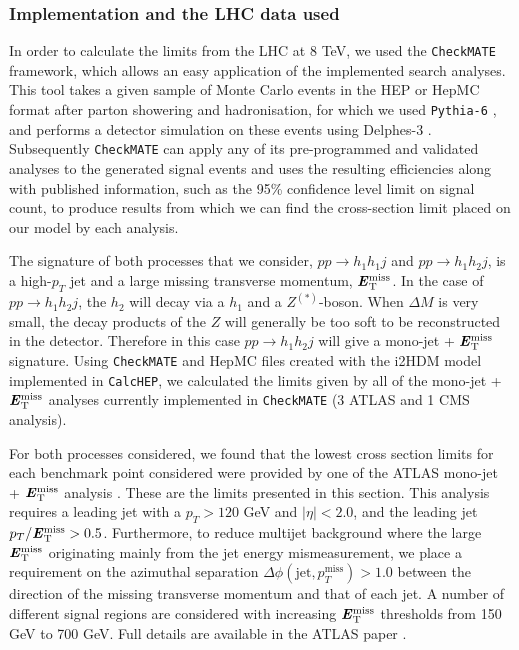 \documentclass[12pt,a4paper]{article}
\newcommand{\MET}{\textbf{\textit{E}$_{\rm T}^{\rm miss}$}}
\begin{document}
\subsubsection{Implementation and the LHC data used}

In order to calculate the limits from the LHC at 8 TeV, we used the {\tt CheckMATE}
\cite{Drees:2013wra,deFavereau:2013fsa,Cacciari:2011ma,Cacciari:2005hq,Cacciari:2008gp,Read:2002hq,Lester:1999tx,Barr:2003rg,Cheng:2008hk} framework, which allows an easy
application of the implemented search analyses. This tool takes a given sample of Monte Carlo events in the HEP or HepMC format after parton showering and hadronisation,
for which we used {\tt Pythia-6} \cite{Sjostrand:2006za}, and performs a detector simulation on these events using Delphes-3 \cite{deFavereau:2013fsa}. Subsequently {\tt CheckMATE} can
apply any of its pre-programmed and validated analyses to the generated signal events and uses the resulting efficiencies along with published information, such as the 95\%
confidence level limit on signal count, to produce results from which we can find the cross-section limit placed on our model by each analysis.

The signature of both processes that we consider, $pp\rightarrow h_1h_1j$  and $pp\rightarrow h_1h_2j$,
is a high-$p_T$ jet and a large missing transverse momentum, $\MET{}$. 
In the case of $pp\rightarrow h_1h_2j$, the $h_2$ will decay via a $h_1$ and a $Z^{(*)}$-boson. When $\Delta M$ is very small, the decay
products of the $Z$ will generally be too soft to be reconstructed in the detector. Therefore in this case $pp\rightarrow h_1h_2j$ will give a mono-jet + $\MET{}$
signature. Using {\tt CheckMATE} and HepMC files created with the i2HDM model implemented in {\tt CalcHEP}, we calculated the limits given by all of the mono-jet +
$\MET{}$ analyses currently implemented in {\tt CheckMATE} \cite{ATLAS:2012zim,Aad:2014nra,Aad:2015zva,Khachatryan:2014rra} (3 ATLAS and 1 CMS analysis).

For both processes considered, we found that the lowest cross section limits for each benchmark point considered were provided by one of the ATLAS mono-jet +
$\MET{}$ analysis \cite{Aad:2015zva}. These are the limits presented in this section. This analysis requires a leading jet with a $p_T > 120$ GeV and $|\eta|
<2.0$, and the leading jet $p_T/\MET > 0.5$. Furthermore, to reduce multijet background where the large $\MET{}$ originating mainly from the jet energy
mismeasurement, we place a requirement on the azimuthal separation $\Delta \phi (\text{jet},p_T^{\text{miss}}) > 1.0$ between the direction of the missing transverse momentum
and that of each jet. A number of different signal regions are considered with increasing $\MET{}$ thresholds from 150 GeV to 700 GeV. Full details are available in
the ATLAS paper \cite{Aad:2015zva}.
\end{document}
